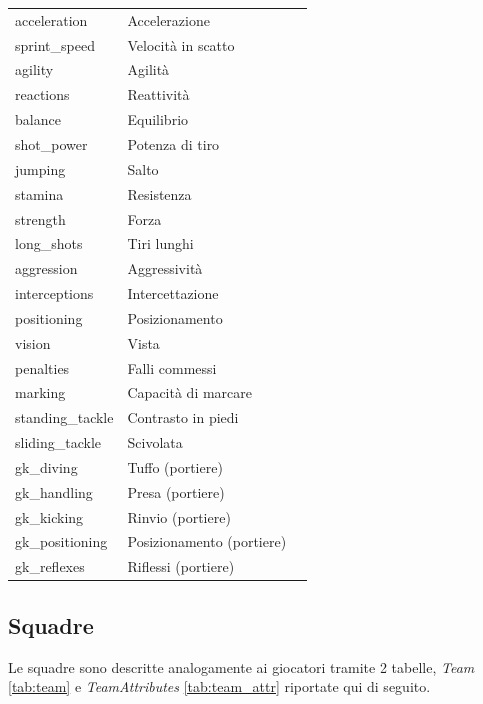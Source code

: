 \documentclass[hidelinks, 12pt]{article}
\begin{document}
\begin{table}[H]
\begin{tabular}{|l|l|l|}
		acceleration & Accelerazione \\
		sprint\_speed & Velocità in scatto \\
		agility & Agilità \\
		reactions & Reattività \\
		balance & Equilibrio \\
		shot\_power & Potenza di tiro \\
		jumping & Salto \\
		stamina & Resistenza \\
		strength & Forza \\
		long\_shots & Tiri lunghi \\
		aggression & Aggressività \\
		interceptions & Intercettazione \\
		positioning & Posizionamento \\
		vision & Vista \\
		penalties & Falli commessi \\
		marking & Capacità di marcare \\
		standing\_tackle & Contrasto in piedi \\
		sliding\_tackle & Scivolata \\
		gk\_diving & Tuffo (portiere) \\
		gk\_handling & Presa (portiere) \\
		gk\_kicking & Rinvio (portiere) \\
		gk\_positioning & Posizionamento (portiere) \\
		gk\_reflexes & Riflessi (portiere) \\
		\hline
	\end{tabular}
\end{table}



\subsection{Squadre}

Le squadre sono descritte analogamente ai giocatori tramite 2 tabelle, {\it Team} \ref{tab:team} e {\it TeamAttributes} \ref{tab:team_attr} riportate qui di seguito.
\end{document}
